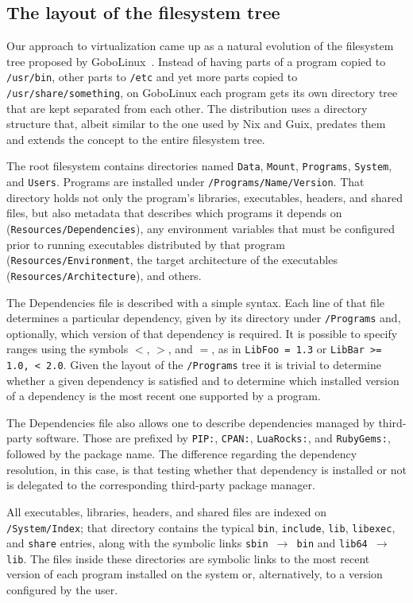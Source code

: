 \documentclass[sigplan, anonymous, 10pt]{acmart}
\begin{document}
\subsection{The layout of the filesystem tree}
Our approach to virtualization came up as a natural evolution of the filesystem tree proposed
by GoboLinux~\cite{GoboLinux}. Instead of having parts of a program copied to \texttt{/usr/bin},
other parts to \texttt{/etc} and yet more parts copied to \texttt{/usr/share/something}, on
GoboLinux each program gets its own directory tree that are kept separated from each other.
The distribution uses a directory structure that, albeit similar to the one used by Nix and
Guix, predates them and extends the concept to the entire filesystem tree.

The root filesystem contains directories named \texttt{Data}, \texttt{Mount}, \texttt{Programs},
\texttt{System}, and \texttt{Users}. Programs are installed under \texttt{/Programs/Name/Version}.
That directory holds not only the program's libraries, executables, headers, and shared files, but
also metadata that describes which programs it depends on (\texttt{Resources/Dependencies}), any
environment variables that must be configured prior to running executables distributed by that
program (\texttt{Resources/Environment}, the target architecture of the executables
(\texttt{Resources/Architecture}), and others.

The Dependencies file is described with a simple syntax. Each line of that file determines
a particular dependency, given by its directory under \texttt{/Programs} and, optionally,
which version of that dependency is required. It is possible to specify ranges using the
symbols $<$, $>$, and $=$, as in \texttt{LibFoo = 1.3} or \texttt{LibBar >= 1.0, < 2.0}.
Given the layout of the \texttt{/Programs} tree it is trivial to determine whether a given
dependency is satisfied and to determine which installed version of a dependency is the most
recent one supported by a program.

The Dependencies file also allows one to describe dependencies managed by third-party
software. Those are prefixed by \texttt{PIP:}, \texttt{CPAN:}, \texttt{LuaRocks:}, and
\texttt{RubyGems:}, followed by the package name. The difference regarding the dependency
resolution, in this case, is that testing whether that dependency is installed or not is
delegated to the corresponding third-party package manager.

All executables, libraries, headers, and shared files are indexed on \texttt{/System/Index};
that directory contains the typical \texttt{bin}, \texttt{include}, \texttt{lib}, \texttt{libexec},
and \texttt{share} entries, along with the symbolic links \texttt{sbin $\rightarrow$ bin} and
\texttt{lib64 $\rightarrow$ lib}. The files inside these directories are symbolic links to the
most recent version of each program installed on the system or, alternatively, to a version
configured by the user.
\end{document}
